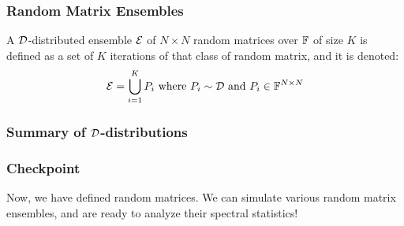 \begin{frame} \frametitle{Random Matrix Ensembles}

\begin{alertblock}{}
A $\mathcal{D}$-distributed ensemble $\mathcal{E}$ of $N \times N$ random matrices over $\mathbb{F}$ of size $K$ is defined as a set of $K$ iterations of that class of random matrix, and it is denoted:
$$ \mathcal{E} = \bigcup_{i = 1}^K P_i \text{ where } P_i \sim \mathcal{D} \text{ and } P_i \in \mathbb{F}^{N \times N} $$
\end{alertblock}

\end{frame}
\begin{frame} \frametitle{Summary of $\mathcal{D}$-distributions}
  \begin{center}
    \Ddisttable
  \end{center}
\end{frame}

\begin{frame} \frametitle{Checkpoint}

Now, we have defined random matrices. We can simulate various random matrix ensembles, and are ready to analyze their spectral statistics!
\end{frame}

